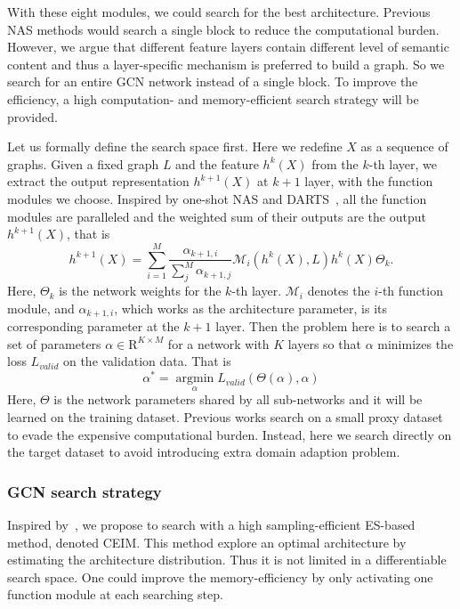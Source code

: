 \documentclass[letterpaper]{article} \usepackage{aaai19}  \usepackage{times}  \usepackage{helvet} \usepackage{courier}  \usepackage[hyphens]{url}  \usepackage{graphicx} \urlstyle{rm} \def\UrlFont{\rm}  \usepackage{graphicx}  \frenchspacing  \setlength{\pdfpagewidth}{8.5in}  \setlength{\pdfpageheight}{11in}
\begin{document}
With these eight modules, we could search for the best architecture. Previous NAS methods would search a single block to reduce the computational burden. However, we argue that different feature layers contain different level of semantic content and thus a layer-specific mechanism is preferred to build a graph. So we search for an entire GCN network instead of a single block. To improve the efficiency, a high computation- and memory-efficient search strategy will be provided. 

Let us formally define the search space first. Here we redefine $X$ as a sequence of graphs. Given a fixed graph $L$ and the feature $h^{k}(X)$ from the $k$-th layer, we extract the output representation $h^{k+1}(X)$ at $k+1$ layer, with the function modules we choose. Inspired by one-shot NAS and DARTS~\cite{liu2018darts}, all the function modules are paralleled and the weighted sum of their outputs are the output $h^{k+1}(X)$, that is
\begin{equation}\label{eq:weighted}
    h^{k+1}(X) = \sum_{i=1}^{M}\frac{\alpha_{k+1,i}}{\sum_{j}^{M} \alpha_{k+1,j}} \mathcal{M}_i(h^{k}(X),L)h^{k}(X)\Theta_k.
\end{equation}
Here, $\Theta_k$ is the network weights for the $k$-th layer. $\mathcal{M}_i$ denotes the $i$-th function module, and $\alpha_{k+1,i}$, which works as the architecture parameter, is its corresponding parameter at the $k+1$ layer. Then the problem here is to search a set of parameters $\alpha\in \mathrm{R}^{K \times M}$ for a network with $K$ layers so that $\alpha$ minimizes the loss $L_{valid}$ on the validation data. That is
\begin{equation}\label{eq:object}
    \alpha^* = \operatorname*{argmin}_{\alpha} L_{valid}({\Theta}(\alpha), \alpha)
\end{equation}
Here, $\Theta$ is the network parameters shared by all sub-networks and it will be learned on the training dataset. Previous works search on a small proxy dataset to evade the expensive computational burden. Instead, here we search directly on the target dataset to avoid introducing extra domain adaption problem.






\subsubsection{GCN search strategy}
Inspired by~\cite{pourchot2018cem}, we propose to search with a high sampling-efficient ES-based method, denoted CEIM. This method explore an optimal architecture by estimating the architecture distribution. Thus it is not limited in a differentiable search space. One could improve the memory-efficiency by only activating one function module at each searching step.
\end{document}
